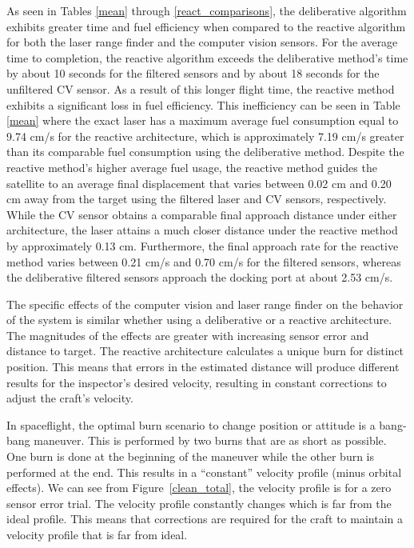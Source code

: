 \documentclass[journal, 10pt]{IEEEtran}
\begin{document}
As seen in Tables \ref{mean} through \ref{react_comparisons}, the deliberative algorithm exhibits greater time and fuel efficiency when compared to the reactive algorithm for both the laser range finder and the computer vision sensors. For the average time to completion, the reactive algorithm exceeds the deliberative method's time by about 10 seconds for the filtered sensors and by about 18 seconds for the unfiltered CV sensor. As a result of this longer flight time, the reactive method exhibits a significant loss in fuel efficiency. This inefficiency can be seen in Table \ref{mean} where the exact laser has a maximum average fuel consumption equal to 9.74 cm/s for the reactive architecture, which is approximately 7.19 cm/s greater than its comparable fuel consumption using the deliberative method. Despite the reactive method's higher average fuel usage, the reactive method guides the satellite to an average final displacement that varies between 0.02 cm and 0.20 cm away from the target using the filtered laser and CV sensors, respectively. While the CV sensor obtains a comparable final approach distance under either architecture, the laser attains a much closer distance under the reactive method by approximately 0.13 cm. Furthermore, the final approach rate for the reactive method varies between 0.21 cm/s and 0.70 cm/s for the filtered sensors, whereas the deliberative filtered sensors approach the docking port at about 2.53 cm/s. 

The specific effects of the computer vision and laser range finder on the behavior of the system is similar whether using a deliberative or a reactive architecture.  The magnitudes of the effects are greater with increasing sensor error and distance to target.  The reactive architecture calculates a unique burn for distinct position.  This means that errors in the estimated distance will produce different results for the inspector's desired velocity, resulting in constant corrections to adjust the craft's velocity. 

In spaceflight, the optimal burn scenario to change position or attitude is a bang-bang maneuver.  This is performed by two burns that are as short as possible.  One burn is done at the beginning of the maneuver while the other burn is performed at the end.  This results in a ``constant'' velocity profile (minus orbital effects).  We can see from Figure~\ref{clean_total}, the velocity profile is for a zero sensor error trial.  The velocity profile constantly changes which is far from the ideal profile.  This means that corrections are required for the craft to maintain a velocity profile that is far from ideal.
\end{document}
